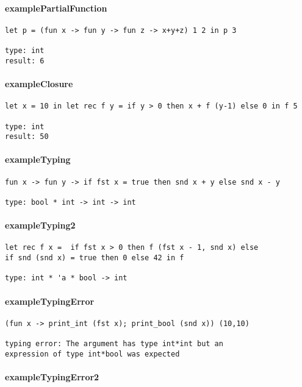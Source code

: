 \documentclass[a4paper, 12pt, titlepage]{article}
\begin{document}
\paragraph{examplePartialFunction}
\begin{verbatim}
let p = (fun x -> fun y -> fun z -> x+y+z) 1 2 in p 3

type: int
result: 6
\end{verbatim}

\paragraph{exampleClosure}
\begin{verbatim}
let x = 10 in let rec f y = if y > 0 then x + f (y-1) else 0 in f 5

type: int
result: 50
\end{verbatim}

\paragraph{exampleTyping}
\begin{verbatim}
fun x -> fun y -> if fst x = true then snd x + y else snd x - y

type: bool * int -> int -> int
\end{verbatim}

\paragraph{exampleTyping2}
\begin{verbatim}
let rec f x =  if fst x > 0 then f (fst x - 1, snd x) else 
if snd (snd x) = true then 0 else 42 in f

type: int * 'a * bool -> int
\end{verbatim}

\paragraph{exampleTypingError}
\begin{verbatim}
(fun x -> print_int (fst x); print_bool (snd x)) (10,10)

typing error: The argument has type int*int but an 
expression of type int*bool was expected
\end{verbatim}

\paragraph{exampleTypingError2}
\end{document}
